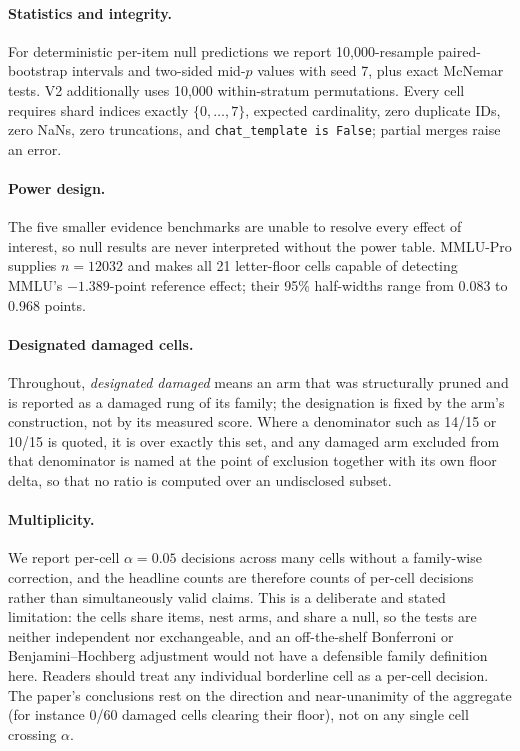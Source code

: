 \paragraph{Statistics and integrity.}
For deterministic per-item null predictions we report 10,000-resample paired-bootstrap intervals and two-sided mid-$p$ values with seed 7, plus exact McNemar tests. V2 additionally uses 10,000 within-stratum permutations. Every cell requires shard indices exactly $\{0,\ldots,7\}$, expected cardinality, zero duplicate IDs, zero NaNs, zero truncations, and \texttt{chat\_template is False}; partial merges raise an error.

\paragraph{Power design.}
The five smaller evidence benchmarks are unable to resolve every effect of interest, so null results are never interpreted without the power table. MMLU-Pro supplies $n=12032$ and makes all 21 letter-floor cells capable of detecting MMLU's $-1.389$-point reference effect; their 95\% half-widths range from 0.083 to 0.968 points.



\paragraph{Designated damaged cells.} Throughout, \emph{designated damaged} means an arm that was structurally pruned and is reported as a damaged rung of its family; the designation is fixed by the arm's construction, not by its measured score. Where a denominator such as 14/15 or 10/15 is quoted, it is over exactly this set, and any damaged arm excluded from that denominator is named at the point of exclusion together with its own floor delta, so that no ratio is computed over an undisclosed subset.

\paragraph{Multiplicity.} We report per-cell $\alpha=0.05$ decisions across many cells without a family-wise correction, and the headline counts are therefore counts of per-cell decisions rather than simultaneously valid claims. This is a deliberate and stated limitation: the cells share items, nest arms, and share a null, so the tests are neither independent nor exchangeable, and an off-the-shelf Bonferroni or Benjamini--Hochberg adjustment would not have a defensible family definition here. Readers should treat any individual borderline cell as a per-cell decision. The paper's conclusions rest on the direction and near-unanimity of the aggregate (for instance 0/60 damaged cells clearing their floor), not on any single cell crossing $\alpha$.

